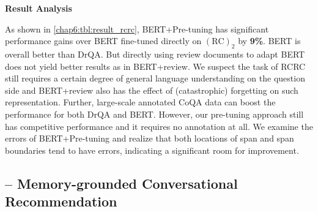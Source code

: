 \begin{table}
    \centering
	\caption{RCRC on EM (Exact Match) and F1.}
\label{chap6:tbl:result_rcrc}
\vspace{-7mm}
\end{table}

\textbf{Result Analysis}

As shown in \ref{chap6:tbl:result_rcrc}, 
BERT+Pre-tuning has significant performance gains over BERT fine-tuned directly on $(\text{RC})_2$ by \textbf{9\%}.
BERT is overall better than DrQA.
But directly using review documents to adapt BERT does not yield better results as in BERT+review.
We suspect the task of RCRC still requires a certain degree of general language understanding on the question side and BERT+review also has the effect of (catastrophic) forgetting \cite{kirkpatrick2017overcoming} on such representation.
Further, large-scale annotated CoQA data can boost the performance for both DrQA and BERT.
However, our pre-tuning approach still has competitive performance and it requires no annotation at all.
We examine the errors of BERT+Pre-tuning and realize that both locations of span and span boundaries tend to have errors, indicating a significant room for improvement.

\subsection{-- Memory-grounded Conversational Recommendation}
\label{chap6:sec:mgcr}

